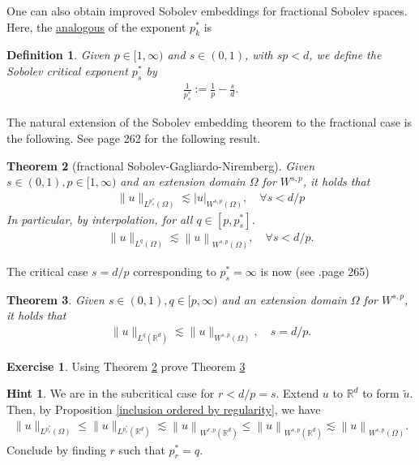 \documentclass[
    a4paper,
    DIV=14,
    abstract=true,
    numbers=noenddot
]
{scrartcl}
\newtheorem{theorem}{Theorem}[section]
\newtheorem{definition}[theorem]{Definition}
\theoremstyle{definition}
\newtheorem{exercise}{Exercise}
\newtheorem*{hint}{Hint}
\newcommand{\tl}[1]{\widetilde{#1}}
\renewcommand{\norm}[1]{\left\lVert #1 \right\rVert}\renewcommand{\abs}[1]{\left| #1 \right|}
\newcommand{\R}{\mathbb{R}}
\begin{document}
One can also obtain improved Sobolev embeddings for fractional Sobolev spaces. Here, the \href{https://nowheredifferentiable.com/2023-07-12-PDEs-3-Sobolev_spaces/#global:~:text=concludes%20the%20proof.%C2%A0%E2%97%BB-,Exercise,-24%20.%20Given}{analogous} of the exponent $p_k^{*}$ is
\begin{definition}
    Given $p \in [1,\infty)$ and $s \in (0,1)$, with $s p<d$, we define the \emph{Sobolev critical exponent} $p_s^*$ by
    \begin{align*}
        \frac{1}{p_s^*}:=\frac{1}{p}-\frac{s}{d}.
    \end{align*}
\end{definition}
The natural extension of the Sobolev embedding theorem to the fractional case is the following.
See \cite{leoni2023first} page 262 for the following result.
\begin{theorem}[fractional Sobolev-Gagliardo-Niremberg]\label{subcritical embedding}
    Given $s \in (0,1), p \in [1,\infty)$ and  an extension domain $\Omega $ for $W^{s,p}$, it holds that
    \begin{align*}
        \|u\|_{L^{p_s^*}(\Omega )} \lesssim |u|_{W^{s, p}(\Omega )}, \quad\forall s <  d / p
    \end{align*}
    In particular, by interpolation, for all $q \in [p,p_s^*]$.
    \begin{align*}
        \|u\|_{L^{q}(\Omega )} \lesssim \norm{u}_{W^{s, p}(\Omega )}, \quad\forall s <  d / p.
    \end{align*}
\end{theorem}
The critical case $s=d/p$ corresponding to $p_s^*=\infty$ is now (see \cite{leoni2023first} .page 265)
\begin{theorem}\label{critical embedding}
    Given $s \in (0,1), q \in [p,\infty)$ and  an extension domain $\Omega $ for $W^{s,p}$, it holds that
    \begin{align*}
        \|u\|_{L^q(\R^d)} \lesssim\|u\|_{W^{s, p}(\Omega)}, \quad s =  d / p.
    \end{align*}
\end{theorem}
\begin{exercise}
    Using Theorem \ref{subcritical embedding} prove Theorem \ref{critical embedding}
\end{exercise}
\begin{hint}
    We are in the subcritical case for $r<d/p=s$. Extend $u$ to $\R^d$ to form $\tl{u}$. Then, by Proposition \ref{inclusion ordered by regularity}, we have
    \begin{align*}
        \|u\|_{L^{p_r^*}(\Omega )}\leq \|u\|_{L^{p_r^*}(\R^d )}  \lesssim \norm{u}_{W^{r, p}(\R^d )}\leq \norm{u}_{W^{s, p}(\R^d  )}\lesssim \norm{u}_{W^{s, p}(\Omega )}.
    \end{align*}
    Conclude by finding $r$ such that $p_r^*=q$.
\end{hint}
\end{document}
